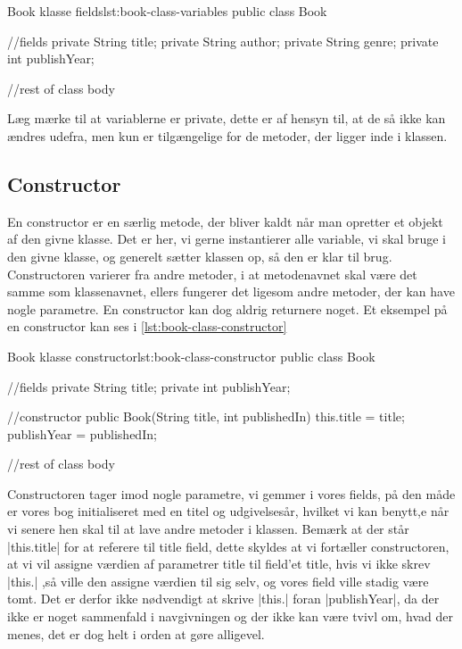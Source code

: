 \begin{JavaCode}{Book klasse fields}{lst:book-class-variables}
	public class Book {
		//fields
		private String title;
		private String author;
		private String genre;
		private int publishYear;
		
		//rest of class body
	}
\end{JavaCode}

Læg mærke til at variablerne er private, dette er af hensyn til, at de så ikke kan ændres udefra, men kun er tilgængelige for de metoder, der ligger inde i klassen.

\subsection{Constructor}

En constructor er en særlig metode, der bliver kaldt når man opretter et objekt af den givne klasse. Det er her, vi gerne instantierer alle variable, vi skal bruge i den givne klasse, og generelt sætter klassen op, så den er klar til brug. Constructoren varierer fra andre metoder, i at metodenavnet skal være det samme som klassenavnet, ellers fungerer det ligesom andre metoder, der kan have nogle parametre. En constructor kan dog aldrig returnere noget. Et eksempel på en constructor kan ses i \autoref{lst:book-class-constructor}

\begin{JavaCode}{Book klasse constructor}{lst:book-class-constructor}
	public class Book {
		//fields
		private String title;
		private int publishYear;
		
		//constructor
		public Book(String title, int publishedIn) {
			this.title = title;
			publishYear = publishedIn;
		}
		
		//rest of class body
	}
\end{JavaCode}

Constructoren tager imod nogle parametre, vi gemmer i vores fields, på den måde er vores bog initialiseret med en titel og udgivelsesår, hvilket vi kan benytt,e når vi senere hen skal til at lave andre metoder i klassen. Bemærk at der står \JavaInline|this.title| for at referere til title field, dette skyldes at vi fortæller constructoren, at vi vil assigne værdien af parametrer title til field'et title, hvis vi ikke skrev \JavaInline|this.| ,så ville den assigne værdien til sig selv, og vores field ville stadig være tomt. Det er derfor ikke nødvendigt at skrive \JavaInline|this.| foran \JavaInline|publishYear|, da der ikke er noget sammenfald i navgivningen og der ikke kan være tvivl om, hvad der menes, det er dog helt i orden at gøre alligevel.

